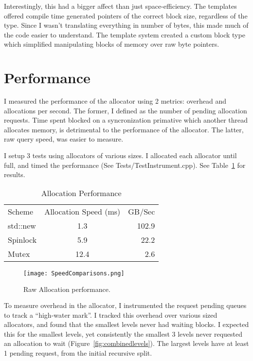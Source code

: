 \documentclass[12pt]{article}
\begin{document}
Interestingly, this had a bigger affect than just space-efficiency.  The
templates offered compile time generated pointers of the correct block size,
regardless of the type.  Since I wasn't translating everything in number of
bytes, this made much of the code easier to understand.  The template system
created a custom block type which simplified manipulating blocks of memory over
raw byte pointers.

\section{Performance}
I measured the performance of the allocator using 2 metrics: overhead and
allocations per second.  The former, I defined as the number of pending
allocation requests.  Time spent blocked on a syncronization primative which
another thread allocates memory, is detrimental to the performance of the
allocator.  The latter, raw query speed, was easier to measure.  

I setup 3 tests using allocators of various sizes.  I allocated each allocator
until full, and timed the performance (See Tests/TestInstrument.cpp).  See
Table~\ref{tab:perf} for results.
\begin{table}[h!]
    \centering
    \begin{tabular}{l c r}
        Scheme & Allocation Speed (ms) & GB/Sec\\
        std::new & 1.3 & 102.9\\
        Spinlock & 5.9 & 22.2\\
        Mutex & 12.4 & 2.6\\
    \end{tabular}
    \caption{Allocation Performance}
    \label{tab:perf}
\end{table}

\begin{figure*}
    \begin{center}
        \texttt{[image: SpeedComparisons.png]}
        \caption{Raw Allocation performance.}
        \label{fig:speed}
    \end{center}
\end{figure*}

To measure overhead in the allocator, I instrumented the request pending queues
to track a ``high-water mark''. I tracked this overhead over various sized
allocators, and found that the smallest levels never had waiting blocks.
I expected this for the smallest levels, yet consistently the smallest 3 levels
never requested an allocation to wait (Figure~\ref{fig:combinedlevels}). The largest 
levels have at least 1 pending request, from the initial recursive split.
\end{document}

